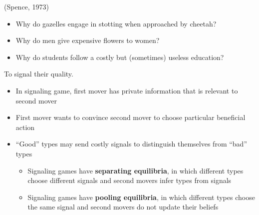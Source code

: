 \begin{definition} (Spence, 1973)
    \begin{itemize}
        \item Why do gazelles engage in stotting when approached by cheetah?
        \item Why do men give expensive flowers to women?
        \item Why do students follow a costly but (sometimes) useless education?
    \end{itemize}
    To signal their quality.

    \begin{itemize}
        \item In signaling game, first mover has private information that is relevant to second mover
        \item First mover wants to convince second mover to choose particular beneficial action
        \item “Good” types may send costly signals to distinguish themselves from “bad” types
              \begin{itemize}
                  \item Signaling games have \textbf{separating equilibria}, in which different types choose
                        different signals and second movers infer types from signals
                  \item Signaling games have \textbf{pooling equilibria}, in which different types choose the same
                        signal and second movers do not update their beliefs
              \end{itemize}
    \end{itemize}
\end{definition}